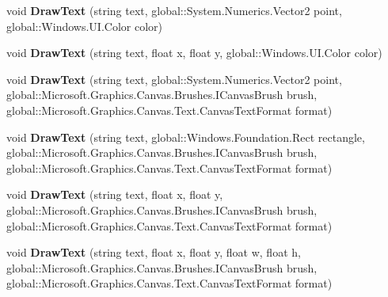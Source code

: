 \begin{DoxyCompactItemize}
void {\bfseries Draw\+Text} (string text, global\+::\+System.\+Numerics.\+Vector2 point, global\+::\+Windows.\+U\+I.\+Color color)
\item 
\mbox{\label{class_microsoft_1_1_graphics_1_1_canvas_1_1_canvas_drawing_session_aad1b1d749b19261e264e8b4a65f81d21}} 
void {\bfseries Draw\+Text} (string text, float x, float y, global\+::\+Windows.\+U\+I.\+Color color)
\item 
\mbox{\label{class_microsoft_1_1_graphics_1_1_canvas_1_1_canvas_drawing_session_a9cd5d45cd381b77ac670c72b3a5f1843}} 
void {\bfseries Draw\+Text} (string text, global\+::\+System.\+Numerics.\+Vector2 point, global\+::\+Microsoft.\+Graphics.\+Canvas.\+Brushes.\+I\+Canvas\+Brush brush, global\+::\+Microsoft.\+Graphics.\+Canvas.\+Text.\+Canvas\+Text\+Format format)
\item 
\mbox{\label{class_microsoft_1_1_graphics_1_1_canvas_1_1_canvas_drawing_session_a23b5e737b4dd5b616b7ef69539e51805}} 
void {\bfseries Draw\+Text} (string text, global\+::\+Windows.\+Foundation.\+Rect rectangle, global\+::\+Microsoft.\+Graphics.\+Canvas.\+Brushes.\+I\+Canvas\+Brush brush, global\+::\+Microsoft.\+Graphics.\+Canvas.\+Text.\+Canvas\+Text\+Format format)
\item 
\mbox{\label{class_microsoft_1_1_graphics_1_1_canvas_1_1_canvas_drawing_session_aa666e507bab764849c32dd4af7a48fc4}} 
void {\bfseries Draw\+Text} (string text, float x, float y, global\+::\+Microsoft.\+Graphics.\+Canvas.\+Brushes.\+I\+Canvas\+Brush brush, global\+::\+Microsoft.\+Graphics.\+Canvas.\+Text.\+Canvas\+Text\+Format format)
\item 
\mbox{\label{class_microsoft_1_1_graphics_1_1_canvas_1_1_canvas_drawing_session_ad6ba3b3276fd9ea0489400dc695da97a}} 
void {\bfseries Draw\+Text} (string text, float x, float y, float w, float h, global\+::\+Microsoft.\+Graphics.\+Canvas.\+Brushes.\+I\+Canvas\+Brush brush, global\+::\+Microsoft.\+Graphics.\+Canvas.\+Text.\+Canvas\+Text\+Format format)
\item 

\end{DoxyCompactItemize}
